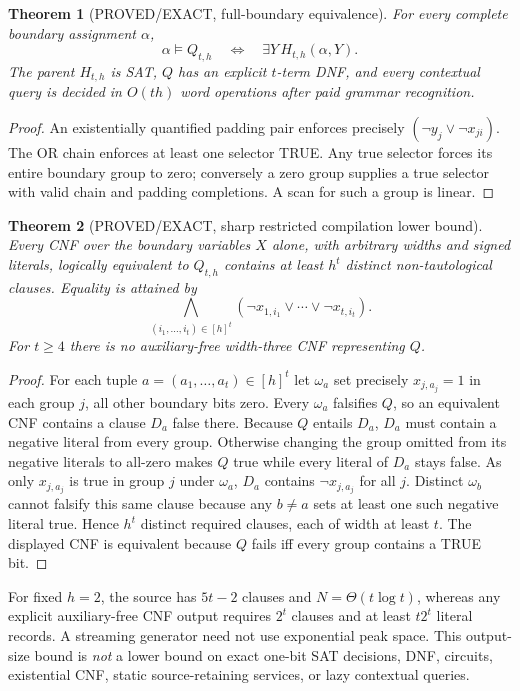 \documentclass[11pt]{article}
\newtheorem{theorem}{Theorem}
\begin{document}
\begin{theorem}[PROVED/EXACT, full-boundary equivalence]
For every complete boundary assignment $\alpha$,
\[
\alpha\models Q_{t,h}\quad\Longleftrightarrow\quad \exists Y\,H_{t,h}(\alpha,Y).
\]
The parent $H_{t,h}$ is SAT, $Q$ has an explicit $t$-term DNF, and every contextual query is decided in $O(th)$ word operations after paid grammar recognition.
\end{theorem}
\begin{proof}
An existentially quantified padding pair enforces precisely $(\neg y_j\vee\neg x_{ji})$. The OR chain enforces at least one selector TRUE. Any true selector forces its entire boundary group to zero; conversely a zero group supplies a true selector with valid chain and padding completions. A scan for such a group is linear.
\end{proof}

\begin{theorem}[PROVED/EXACT, sharp restricted compilation lower bound]
Every CNF over the boundary variables $X$ alone, with arbitrary widths and signed literals, logically equivalent to $Q_{t,h}$ contains at least $h^t$ distinct non-tautological clauses. Equality is attained by
\[
\bigwedge_{(i_1,\ldots,i_t)\in[h]^t}
(\neg x_{1,i_1}\vee\cdots\vee\neg x_{t,i_t}).
\]
For $t\ge4$ there is no auxiliary-free width-three CNF representing $Q$.
\end{theorem}
\begin{proof}
For each tuple $a=(a_1,\ldots,a_t)\in[h]^t$ let $\omega_a$ set precisely $x_{j,a_j}=1$ in each group $j$, all other boundary bits zero. Every $\omega_a$ falsifies $Q$, so an equivalent CNF contains a clause $D_a$ false there. Because $Q$ entails $D_a$, $D_a$ must contain a negative literal from every group. Otherwise changing the group omitted from its negative literals to all-zero makes $Q$ true while every literal of $D_a$ stays false. As only $x_{j,a_j}$ is true in group $j$ under $\omega_a$, $D_a$ contains $\neg x_{j,a_j}$ for all $j$. Distinct $\omega_b$ cannot falsify this same clause because any $b\ne a$ sets at least one such negative literal true. Hence $h^t$ distinct required clauses, each of width at least $t$. The displayed CNF is equivalent because $Q$ fails iff every group contains a TRUE bit.
\end{proof}
For fixed $h=2$, the source has $5t-2$ clauses and $N=\Theta(t\log t)$, whereas any explicit auxiliary-free CNF output requires $2^t$ clauses and at least $t2^t$ literal records. A streaming generator need not use exponential peak space. This output-size bound is \emph{not} a lower bound on exact one-bit SAT decisions, DNF, circuits, existential CNF, static source-retaining services, or lazy contextual queries.
\end{document}
